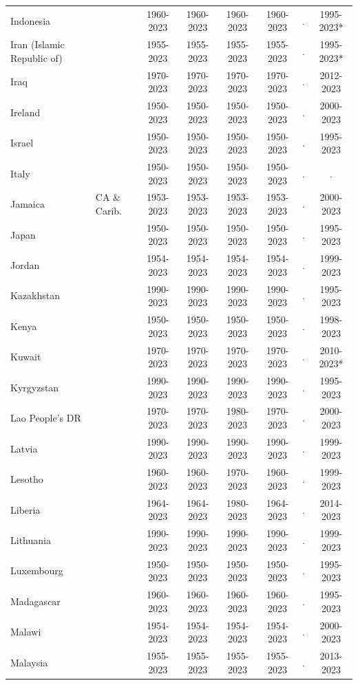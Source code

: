 \begin{longtable}{ll*{6}{c}}
Indonesia &  & 1960-2023 & 1960-2023 & 1960-2023 & 1960-2023 & . & 1995-2023* \\
Iran (Islamic Republic of) &  & 1955-2023 & 1955-2023 & 1955-2023 & 1955-2023 & . & 1995-2023* \\
Iraq &  & 1970-2023 & 1970-2023 & 1970-2023 & 1970-2023 & . & 2012-2023 \\
Ireland &  & 1950-2023 & 1950-2023 & 1950-2023 & 1950-2023 & . & 2000-2023 \\
Israel &  & 1950-2023 & 1950-2023 & 1950-2023 & 1950-2023 & . & 1995-2023 \\
Italy &  & 1950-2023 & 1950-2023 & 1950-2023 & 1950-2023 & . & . \\
Jamaica & CA \& Carib. & 1953-2023 & 1953-2023 & 1953-2023 & 1953-2023 & . & 2000-2023 \\
Japan &  & 1950-2023 & 1950-2023 & 1950-2023 & 1950-2023 & . & 1995-2023 \\
Jordan &  & 1954-2023 & 1954-2023 & 1954-2023 & 1954-2023 & . & 1999-2023 \\
Kazakhstan &  & 1990-2023 & 1990-2023 & 1990-2023 & 1990-2023 & . & 1995-2023 \\
Kenya &  & 1950-2023 & 1950-2023 & 1950-2023 & 1950-2023 & . & 1998-2023 \\
Kuwait &  & 1970-2023 & 1970-2023 & 1970-2023 & 1970-2023 & . & 2010-2023* \\
Kyrgyzstan &  & 1990-2023 & 1990-2023 & 1990-2023 & 1990-2023 & . & 1995-2023 \\
Lao People's DR &  & 1970-2023 & 1970-2023 & 1980-2023 & 1970-2023 & . & 2000-2023 \\
Latvia &  & 1990-2023 & 1990-2023 & 1990-2023 & 1990-2023 & . & 1999-2023 \\
Lesotho &  & 1960-2023 & 1960-2023 & 1970-2023 & 1960-2023 & . & 1999-2023 \\
Liberia &  & 1964-2023 & 1964-2023 & 1980-2023 & 1964-2023 & . & 2014-2023 \\
Lithuania &  & 1990-2023 & 1990-2023 & 1990-2023 & 1990-2023 & . & 1999-2023 \\
Luxembourg &  & 1950-2023 & 1950-2023 & 1950-2023 & 1950-2023 & . & 1995-2023 \\
Madagascar &  & 1960-2023 & 1960-2023 & 1960-2023 & 1960-2023 & . & 1995-2023 \\
Malawi &  & 1954-2023 & 1954-2023 & 1954-2023 & 1954-2023 & . & 2000-2023 \\
Malaysia &  & 1955-2023 & 1955-2023 & 1955-2023 & 1955-2023 & . & 2013-2023 \\

\end{longtable}

